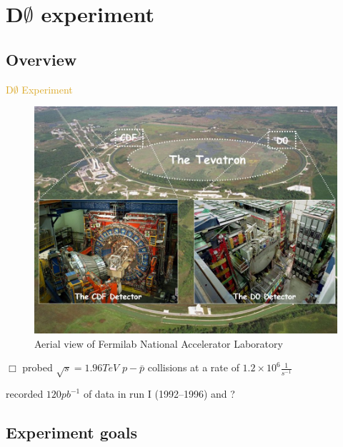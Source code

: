 

\section{D$\emptyset$ experiment}
\subsection{Overview}

\begin{frame}{\textcolor{Goldenrod}{D$\emptyset$ Experiment}}
  \begin{overlayarea}{\textwidth}{\textheight}
    \begin{figure}[h]\centering
      \includegraphics[height=0.5\textheight]{./Images/02_D0_general.jpg}
      \caption*{Aerial view of Fermilab National Accelerator Laboratory}
    \end{figure}
    
    \itt
  \item[$\Box$] probed $\sqrt{s} = 1.96 TeV$ $p-\bar{p}$ collisions at a rate of
    \alert{$1.2\times 10^{6}\frac{1}{s^{-1}}$}

  \item recorded $120 pb^{-1}$ of data in run I (1992–1996) and  ? 
    \tti
  \end{overlayarea}
\end{frame}

\subsection{Experiment goals}

